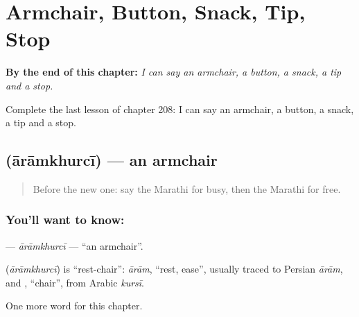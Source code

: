 
\chapter{Armchair, Button, Snack, Tip, Stop}
\label{ch:mr-armchair-button-snack-tip-stop}

\begin{chapteropening}
\textbf{By the end of this chapter:} \emph{I can say an armchair, a button, a snack, a tip and a stop.}

Complete the last lesson of chapter 208: I can say an armchair, a button, a snack, a tip and a stop.
\end{chapteropening}

\section[\texorpdfstring{\mr{आरामखुर्ची} (ārāmkhurcī)}{आरामखुर्ची (ārāmkhurcī)}]{ (ārāmkhurcī) — an armchair}

\label{lesson:MR-C208-aramkhurci}



\begin{quote}
Before the new one: say the Marathi for busy, then the Marathi for free.
\end{quote}

\subsection*{You'll want to know: }
\textbf{} — \emph{ārāmkhurcī} — \textquotedblleft{}an armchair\textquotedblright{}.

\begin{cousinweb}
\textbf{} (\emph{ārāmkhurcī}) is \textquotedblleft{}rest-chair\textquotedblright{}: \emph{ārām}, \textquotedblleft{}rest, ease\textquotedblright{}, usually traced to Persian \emph{ārām}, and \textbf{}, \textquotedblleft{}chair\textquotedblright{}, from Arabic \emph{kursī}.
\end{cousinweb}

\begin{grammarlens}[title={What you've built}]
One more word for this chapter.
\end{grammarlens}

